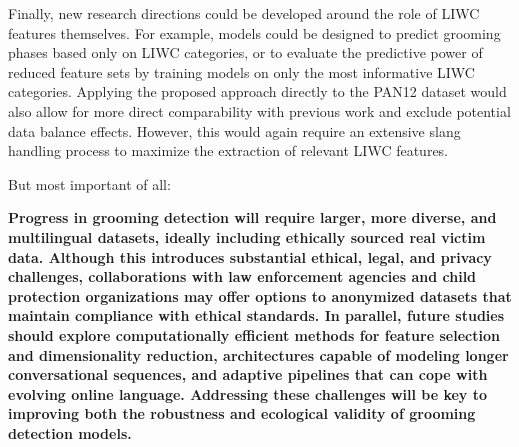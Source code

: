 Finally, new research directions could be developed around the role of LIWC features themselves. For example, models could be designed to predict grooming phases based only on LIWC categories, or to evaluate the predictive power of reduced feature sets by training models on only the most informative LIWC categories. Applying the proposed approach directly to the PAN12 dataset would also allow for more direct comparability with previous work and exclude potential data balance effects. However, this would again require an extensive slang handling process to maximize the extraction of relevant LIWC features.


But most important of all:
 
\textbf{Progress in grooming detection will require larger, more diverse, and multilingual datasets, ideally including ethically sourced real victim data. Although this introduces substantial ethical, legal, and privacy challenges, collaborations with law enforcement agencies and child protection organizations may offer options to anonymized datasets that maintain compliance with ethical standards. In parallel, future studies should explore computationally efficient methods for feature selection and dimensionality reduction, architectures capable of modeling longer conversational sequences, and adaptive pipelines that can cope with evolving online language. Addressing these challenges will be key to improving both the robustness and ecological validity of grooming detection models.}  

\begin{comment}



10) Grenzen & Validität (kurz vorwegnehmen, mit Verweis auf Limitations)

Domänen-Shift: Unbekannte Plattformen/Sprachen; Slang-Drift.

Datenetiketten: PJ (Decoy-Chats) ≠ echte Opferdialoge; PAN12-Negativklasse heterogen.

Statistik: Sehr wenige Fehlerfälle im Subset-Setup (n(FN)=40) → geringe Power mancher Tests. 

main

11) Design-Konsequenzen & Future Directions (als Brücke zum Ausblick)

Feintuning auf FN: gezielte Hard-Negative-Mining/Cost-Sensitive Loss für Recall-Stabilität ohne Präzisionseinbruch.

Adaptive Fenster: dynamische Chunking/Hierarchische Modelle für lange Dialoge.

Domänen-Robustheit: Adversarial Training gegen Stil/Längen-Shortcuts; Cross-Platform Evaluation.

Mehr Psycholinguistik: Diskurs-Züge/Pragmatik, Gesprächsakte, turn-taking-Features zusätzlich zu LIWC.

Human-in-the-Loop: Thresholding + Erklärungen für Reviewer-Workflows.


\end{comment}






